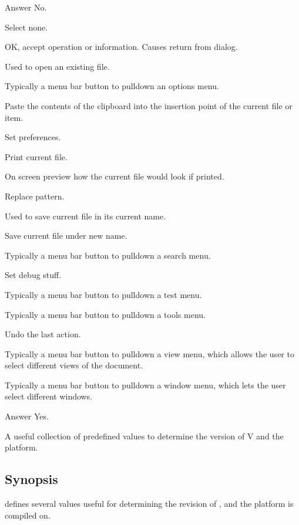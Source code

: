  Answer No.

 Select none.

 OK, accept operation or information. Causes return
from dialog.

 Used to open an existing file.

 Typically a menu bar button to pulldown an options menu.

 Paste the contents of the clipboard into the insertion
point of the current file or item.

 Set preferences.

 Print current file.

 On screen preview how the current file would look
if printed.

 Replace pattern.

 Used to save current file in its current name.

 Save current file under new name.

 Typically a menu bar button to pulldown a search menu.

 Set debug stuff.

 Typically a menu bar button to pulldown a test menu.

 Typically a menu bar button to pulldown a tools menu.

 Undo the last action.

 Typically a menu bar button to pulldown a view menu, which
allows the user to select different views of the document.

 Typically a menu bar button to pulldown a window menu, which
lets the user select different windows.

 Answer Yes.


A useful collection of predefined values to determine the
version of V and the platform.

\subsection* {Synopsis}

\V defines several values useful for determining the revision of
\V, and the platform \V is compiled on.

